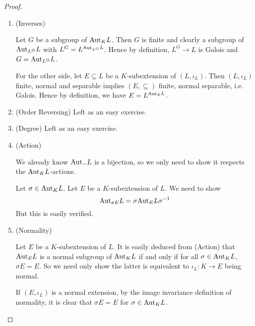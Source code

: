 \documentclass[../book.tex]{subfiles}
\begin{document}
\begin{proof}\begin{enumerate}

    \item (Inverses)
        
        Let $G$ be a subgroup of $\mathrm{Aut}_{K}L$. 
        Then $G$ is finite and clearly a subgroup of $\mathrm{Aut}_{L^G}L$
        with $L^G = L^{\mathrm{Aut}_{L^G}L}$. 
        Hence by definition, $L^G \to L$ is Galois and $G = \mathrm{Aut}_{L^G}L$. 
        
        For the other side, let $E \subseteq L$ be a $K$-subextension of $(L,\iota_L)$.
        Then $(L,\iota_L)$ finite, normal and separable implies
        $(E,\subseteq)$ finite, normal separable, i.e. Galois.
        Hence by definition, we have $E = L^{\mathrm{Aut}_{E}L}$. 
        
    \item (Order Reversing) Left as an easy exercise. 
        
    \item (Degree) Left as an easy exercise.
    
    \item (Action) 
        
        We already know $\mathrm{Aut}_{-}L$ is a bijection,
        so we only need to show it respects the $\mathrm{Aut}_{K}L$-actions.
        
        Let $\sigma \in \mathrm{Aut}_{K}L$. Let $E$ be a $K$-subextension of $L$. 
        We need to show \[
            \mathrm{Aut}_{\sigma E}L = \sigma \mathrm{Aut}_{E}L \sigma^{-1}
        \]
        But this is easily verified.
    
    \item (Normality)
        
        Let $E$ be a $K$-subextension of $L$.
        It is easily deduced from (Action) that
        $\mathrm{Aut}_{E}L$ is a normal subgroup of $\mathrm{Aut}_{K}L$
        if and only if for all $\sigma \in \mathrm{Aut}_{K}L$, $\sigma E = E$.
        So we need only show the latter is equivalent to 
        $\iota_L : K \to E$ being normal.
        
        If $(E,\iota_L)$ is a normal extension, 
        by the image invariance definition of normality,
        it is clear that $\sigma E = E$ for $\sigma \in \mathrm{Aut}_{K}L$.
        
        

\end{enumerate}
\end{proof}
\end{document}
